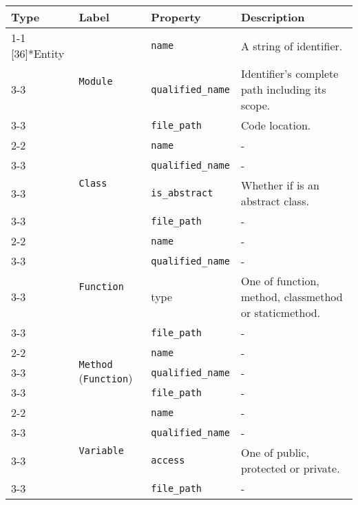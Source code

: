 \begin{tabularx}{\textwidth}{p{1.8cm}llX}
\toprule
\textbf{Type} & \textbf{Label} & \textbf{Property} & \textbf{Description} \\
\cmidrule{1-1}\cmidrule{2-2}\cmidrule{3-3}\cmidrule{4-4}
\multirow{18}[{36}]{*}{Entity} & \multirow{3}[{6}]{*}{\texttt{Module}} & \texttt{name} & A string of identifier. \\
\cmidrule{3-3}\cmidrule{4-4}
 &  & \texttt{qualified\_\texttt{name}} & Identifier's complete path including its scope. \\
\cmidrule{3-3}\cmidrule{4-4}
 &  & \texttt{file\_path} & Code location. \\
\cmidrule{2-2}\cmidrule{3-3}\cmidrule{4-4}
 & \multirow{4}[{8}]{*}{\texttt{Class}} & \texttt{name} & - \\
\cmidrule{3-3}\cmidrule{4-4}
 &  & \texttt{qualified\_\texttt{name}} & - \\
\cmidrule{3-3}\cmidrule{4-4}
 &  & \texttt{is\_abstract} & Whether if is an abstract class. \\
\cmidrule{3-3}\cmidrule{4-4}
 &  & \texttt{file\_path} & - \\
\cmidrule{2-2}\cmidrule{3-3}\cmidrule{4-4}
 & \multirow{4}[{8}]{*}{\texttt{Function}} & \texttt{name} & - \\
\cmidrule{3-3}\cmidrule{4-4}
 &  & \texttt{qualified\_\texttt{name}} & - \\
\cmidrule{3-3}\cmidrule{4-4}
 &  & type & One of function, method, classmethod or staticmethod. \\
\cmidrule{3-3}\cmidrule{4-4}
 &  & \texttt{file\_path} & - \\
\cmidrule{2-2}\cmidrule{3-3}\cmidrule{4-4}
 & \multirow{3}[{6}]{*}{\texttt{Method} (\texttt{Function})} & \texttt{name} & - \\
\cmidrule{3-3}\cmidrule{4-4}
 &  & \texttt{qualified\_\texttt{name}} & - \\
\cmidrule{3-3}\cmidrule{4-4}
 &  & \texttt{file\_path} & - \\
\cmidrule{2-2}\cmidrule{3-3}\cmidrule{4-4}
 & \multirow{4}[{8}]{*}{\texttt{Variable}} & \texttt{name} & - \\
\cmidrule{3-3}\cmidrule{4-4}
 &  & \texttt{qualified\_\texttt{name}} & - \\
\cmidrule{3-3}\cmidrule{4-4}
 &  & \texttt{access} & One of public, protected or private. \\
\cmidrule{3-3}\cmidrule{4-4}
 &  & \texttt{file\_path} & - \\
\bottomrule
\end{tabularx}

